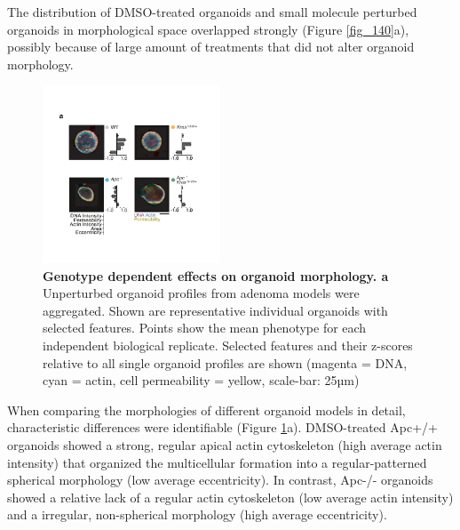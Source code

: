\begin{flushleft}
The distribution of DMSO-treated organoids and small molecule perturbed organoids in morphological space overlapped strongly (Figure \ref{fig_140}a), possibly because of large amount of treatments that did not alter organoid morphology.

\begin{figure}[h]
\centering
\includegraphics[width=200,
                height=\textheight,
                keepaspectratio]{figures/adenomaprofiling/pdf/fig_1_3.pdf}
\caption{\textbf{Genotype dependent effects on organoid morphology. a} Unperturbed organoid profiles from adenoma models were aggregated. Shown are representative individual organoids with selected features. Points show the mean phenotype for each independent biological replicate. Selected features and their z-scores relative to all single organoid profiles are shown (magenta = DNA, cyan = actin, cell permeability = yellow, scale-bar: 25µm)}
\label{fig_130}
\end{figure}
\bigbreak

When comparing the morphologies of different organoid models in detail, characteristic differences were identifiable (Figure \ref{fig_130}a). DMSO-treated Apc+/+ organoids showed a strong, regular apical actin cytoskeleton (high average actin intensity) that organized the multicellular formation into a regular-patterned spherical morphology (low average eccentricity). In contrast, Apc-/- organoids showed a relative lack of a regular actin cytoskeleton (low average actin intensity) and a irregular, non-spherical morphology (high average eccentricity). 


\end{flushleft}
